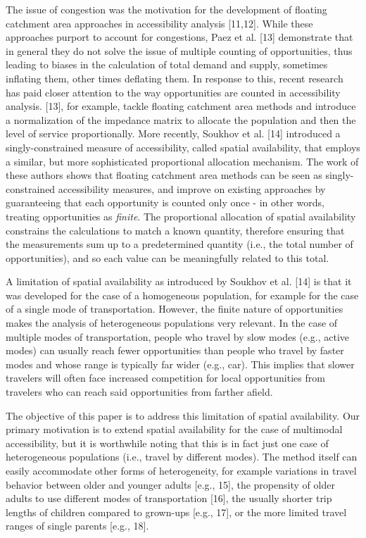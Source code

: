 \documentclass[10pt,letterpaper]{article}
\begin{document}
The issue of congestion was the motivation for the development of
floating catchment area approaches in accessibility analysis
{[}11,12{]}. While these approaches purport to account for congestions,
Paez et al. {[}13{]} demonstrate that in general they do not solve the
issue of multiple counting of opportunities, thus leading to biases in
the calculation of total demand and supply, sometimes inflating them,
other times deflating them. In response to this, recent research has
paid closer attention to the way opportunities are counted in
accessibility analysis. {[}13{]}, for example, tackle floating catchment
area methods and introduce a normalization of the impedance matrix to
allocate the population and then the level of service proportionally.
More recently, Soukhov et al. {[}14{]} introduced a singly-constrained
measure of accessibility, called spatial availability, that employs a
similar, but more sophisticated proportional allocation mechanism. The
work of these authors shows that floating catchment area methods can be
seen as singly-constrained accessibility measures, and improve on
existing approaches by guaranteeing that each opportunity is counted
only once - in other words, treating opportunities as \emph{finite}. The
proportional allocation of spatial availability constrains the
calculations to match a known quantity, therefore ensuring that the
measurements sum up to a predetermined quantity (i.e., the total number
of opportunities), and so each value can be meaningfully related to this
total.

A limitation of spatial availability as introduced by Soukhov et al.
{[}14{]} is that it was developed for the case of a homogeneous
population, for example for the case of a single mode of transportation.
However, the finite nature of opportunities makes the analysis of
heterogeneous populations very relevant. In the case of multiple modes
of transportation, people who travel by slow modes (e.g., active modes)
can usually reach fewer opportunities than people who travel by faster
modes and whose range is typically far wider (e.g., car). This implies
that slower travelers will often face increased competition for local
opportunities from travelers who can reach said opportunities from
farther afield.

The objective of this paper is to address this limitation of spatial
availability. Our primary motivation is to extend spatial availability
for the case of multimodal accessibility, but it is worthwhile noting
that this is in fact just one case of heterogeneous populations (i.e.,
travel by different modes). The method itself can easily accommodate
other forms of heterogeneity, for example variations in travel behavior
between older and younger adults {[}e.g., 15{]}, the propensity of older
adults to use different modes of transportation {[}16{]}, the usually
shorter trip lengths of children compared to grown-ups {[}e.g., 17{]},
or the more limited travel ranges of single parents {[}e.g., 18{]}.
\end{document}
